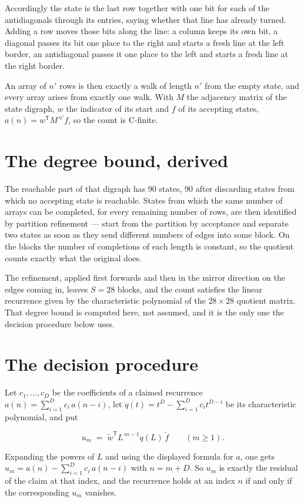 \documentclass[11pt]{article}
\theoremstyle{definition}
\begin{document}
Accordingly the state is the last row together with one bit for each of the antidiagonals through its entries, saying whether that line has already turned. Adding a row moves those bits along the line: a column keeps its own bit, a diagonal passes its bit one place to the right and starts a fresh line at the left border, an antidiagonal passes it one place to the left and starts a fresh line at the right border.

An array of $n'$ rows is then exactly a walk of length $n'$ from the empty state, and every array arises from exactly one walk. With $M$ the adjacency matrix of the state digraph, $w$ the indicator of its start and $f$ of its accepting states, $a(n) = w^{\mathsf T}M^{\,n'}f$, so the count is C-finite.

\section{The degree bound, derived}

The reachable part of that digraph has $90$ states, $90$ after discarding states from which no accepting state is reachable. States from which the same number of arrays can be completed, for every remaining number of rows, are then identified by partition refinement --- start from the partition by acceptance and separate two states as soon as they send different numbers of edges into some block. On the blocks the number of completions of each length is constant, so the quotient counts exactly what the original does.

The refinement, applied first forwards and then in the mirror direction on the edges coming in, leaves $S = 28$ blocks, and the count satisfies the linear recurrence given by the characteristic polynomial of the $28 \times 28$ quotient matrix. That degree bound is computed here, not assumed, and it is the only one the decision procedure below uses.

\section{The decision procedure}

Let $c_1,\dots,c_D$ be the coefficients of a claimed recurrence $a(n) = \sum_{i=1}^{D} c_i\,a(n-i)$, let $q(t) = t^{D} - \sum_{i=1}^{D} c_i t^{D-i}$ be its characteristic polynomial, and put

\[u_m \;=\; \tilde w^{\mathsf T} L^{\,m-1} q(L)\,\tilde f \qquad (m \ge 1).\]

Expanding the powers of $L$ and using the displayed formula for $a$, one gets $u_m = a(n) - \sum_{i=1}^{D} c_i\,a(n-i)$ with $n = m + D$. So $u_m$ is exactly the residual of the claim at that index, and the recurrence holds at an index $n$ if and only if the corresponding $u_m$ vanishes.
\end{document}

